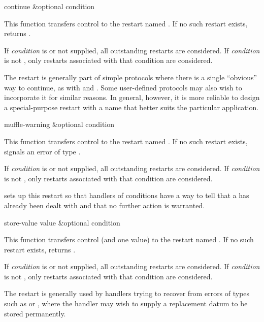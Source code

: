 \begin{defun}[Function]
continue &optional condition

  This function transfers control to the restart named . If no such
  restart exists,  returns .

 If {\it condition} is  or not supplied, all outstanding restarts
are considered.
If {\it condition} is not , only restarts associated
with that condition are considered.

  The  restart is generally part of simple protocols where there is
  a single ``obvious'' way to continue, as with  and . Some
  user-defined protocols may also wish to incorporate it for similar reasons.
  In general, however, it is more reliable to design a special-purpose restart
  with a name that better suits the particular application.
\end{defun}

\begin{defun}[Function]
muffle-warning &optional condition

  This function transfers control to the restart named .
  If no such restart exists,  signals an error of type 
  .
 
 If {\it condition} is  or not supplied, all outstanding restarts
are considered.
If {\it condition} is not , only restarts associated
with that condition are considered.

   sets up this restart so that handlers of  conditions have
  a way to tell  that a  has already been dealt with and
  that no further action is warranted.
\end{defun}

\begin{defun}[Function]
store-value value &optional condition

  This function transfers control (and one value) to the restart named
  . If no such restart exists,  returns .

 If {\it condition} is  or not supplied, all outstanding restarts
are considered.
If {\it condition} is not , only restarts associated
with that condition are considered.

  The  restart is generally used by handlers trying to recover
  from errors of types such as  or , where the handler
  may wish to supply a replacement datum to be stored permanently.
\end{defun}

